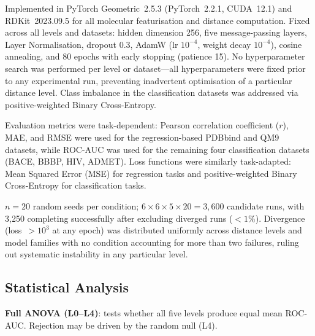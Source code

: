 \documentclass[pdflatex,sn-vancouver-num]{sn-jnl}%
\theoremstyle{thmstyleone}%
\theoremstyle{thmstyletwo}%
\theoremstyle{thmstylethree}%
\begin{document}
Implemented in PyTorch Geometric~2.5.3 \cite{fey2019pyg} (PyTorch~2.2.1,
CUDA~12.1) and RDKit~2023.09.5 \cite{landrum2023rdkit} for all
molecular featurisation and distance computation.  Fixed across all
levels and datasets: hidden dimension 256, five message-passing layers,
Layer Normalisation, dropout 0.3, AdamW (lr $10^{-4}$, weight decay
$10^{-4}$), cosine annealing, and 80 epochs with early stopping
(patience 15).  No hyperparameter search was performed per level or
dataset---all hyperparameters were fixed prior to any experimental run,
preventing inadvertent optimisation of a particular distance level.
Class imbalance in the classification datasets was addressed via
positive-weighted Binary Cross-Entropy.

Evaluation metrics were task-dependent: Pearson correlation coefficient
($r$), MAE, and RMSE were used for the regression-based PDBbind and QM9
datasets, while ROC-AUC was used for the remaining four classification
datasets (BACE, BBBP, HIV, ADMET). Loss functions were similarly
task-adapted: Mean Squared Error (MSE) for regression tasks and
positive-weighted Binary Cross-Entropy for classification tasks.

$n{=}20$ random seeds per condition; $6 \times 6 \times 5 \times 20
= 3{,}600$ candidate runs, with 3,250 completing successfully after
excluding diverged runs ($<1\%$).  Divergence (loss~$> 10^3$ at any
epoch) was distributed uniformly across distance levels and model
families with no condition accounting for more than two failures,
ruling out systematic instability in any particular level.

\subsection{Statistical Analysis}

\textbf{Full ANOVA (L0--L4)}: tests whether all five levels produce equal
mean ROC-AUC.  Rejection may be driven by the random null (L4).
\end{document}
